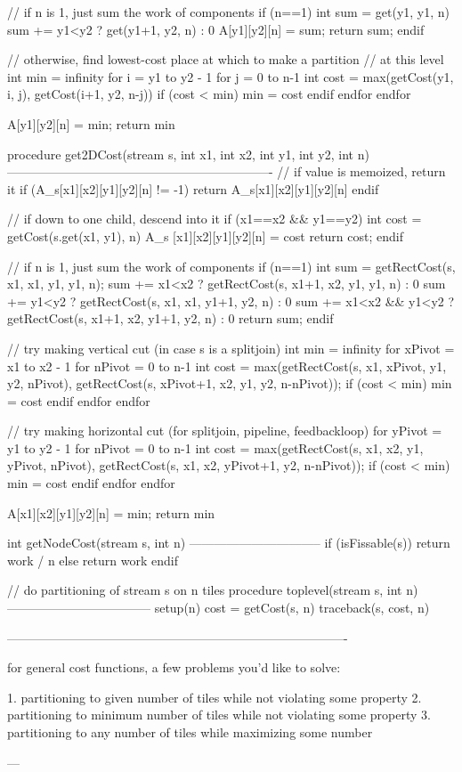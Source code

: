 // if n is 1, just sum the work of components
if (n==1)
  int sum = get(y1, y1, n)
  sum += y1<y2 ? get(y1+1, y2, n) : 0
  A[y1][y2][n] = sum;
  return sum;
endif

// otherwise, find lowest-cost place at which to make a partition
// at this level 
int min = infinity
for i = y1 to y2 - 1
  for j = 0 to n-1
    int cost = max(getCost(y1, i, j), getCost(i+1, y2, n-j))
    if (cost < min)
      min = cost
    endif
  endfor
endfor

A[y1][y2][n] = min;
return min


procedure get2DCost(stream s, int x1, int x2, int y1, int y2, int n)
----------------------------------------------------------------
// if value is memoized, return it
if (A_s[x1][x2][y1][y2][n] != -1)
  return A_s[x1][x2][y1][y2][n]
endif

// if down to one child, descend into it
if (x1==x2 && y1==y2)
  int cost = getCost(s.get(x1, y1), n)
  A_s [x1][x2][y1][y2][n] = cost
  return cost;
endif

// if n is 1, just sum the work of components
if (n==1)
  int sum = getRectCost(s, x1, x1, y1, y1, n);
  sum += x1<x2 ? getRectCost(s, x1+1, x2, y1, y1, n) : 0
  sum += y1<y2 ? getRectCost(s, x1, x1, y1+1, y2, n) : 0
  sum += x1<x2 && y1<y2 ? getRectCost(s, x1+1, x2, y1+1, y2, n) : 0
  return sum;
endif

// try making vertical cut (in case s is a splitjoin)
int min = infinity
for xPivot = x1 to x2 - 1
  for nPivot = 0 to n-1
    int cost = max(getRectCost(s, x1, xPivot, y1, y2, nPivot),
                   getRectCost(s, xPivot+1, x2, y1, y2, n-nPivot));
    if (cost < min)
      min = cost
    endif
  endfor
endfor

// try making horizontal cut (for splitjoin, pipeline, feedbackloop)
for yPivot = y1 to y2 - 1
  for nPivot = 0 to n-1
    int cost = max(getRectCost(s, x1, x2, y1, yPivot, nPivot),
                   getRectCost(s, x1, x2, yPivot+1, y2, n-nPivot));
    if (cost < min)
      min = cost
    endif
  endfor
endfor

A[x1][x2][y1][y2][n] = min;
return min

int getNodeCost(stream s, int n)
--------------------------------
if (isFissable(s))
  return work / n
else
  return work
endif

// do partitioning of stream s on n tiles
procedure toplevel(stream s, int n)
-----------------------------------
setup(n)
cost = getCost(s, n)
traceback(s, cost, n)

----------------------------------------------------------------------------------

for general cost functions, a few problems you'd like to solve:

1. partitioning to given number of tiles while not violating some property
2. partitioning to minimum number of tiles while not violating some property
3. partitioning to any number of tiles while maximizing some number

--- 




